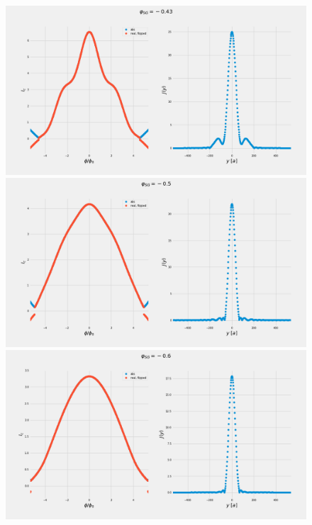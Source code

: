 \documentclass[a4paper]{article}
\begin{document}
\begin{figure}
\includegraphics[width=\textwidth]{figs/wg32double/current_and_density_043}
\includegraphics[width=\textwidth]{figs/wg32double/current_and_density_05}
\includegraphics[width=\textwidth]{figs/wg32double/current_and_density_06}
\end{figure}
\end{document}

